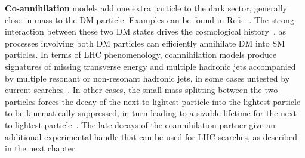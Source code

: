 \textbf{Co-annihilation} models add one extra particle to the dark sector, generally close in mass to the DM particle. Examples can be found in Refs.~\cite{Buschmann:2016hkc,Baker:2015qna,Khoze:2017ixx}. The strong interaction between these two DM states drives the cosmological history~\cite{PlehnLecturesDM}, as processes involving both DM particles can efficiently annihilate DM into SM particles. In terms of LHC phenomenology, coannihilation models produce signatures of missing transverse energy and multiple hadronic jets accompanied by multiple resonant or non-resonant hadronic jets, in some cases untested by current searches~\cite{Buschmann:2016hkc}. In other cases, the small mass splitting between the two particles forces the decay of the next-to-lightest particle into the lightest particle to be kinematically suppressed, in turn leading to a sizable lifetime for the next-to-lightest particle~\cite{Khoze:2017ixx}. The late decays of the coannihilation partner give an additional experimental handle that can be used for LHC searches, as described in the next chapter.  




